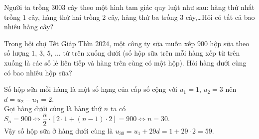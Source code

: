 \begin{bt}%
Người ta trồng $3003$ cây theo một hình tam giác quy luật như sau: hàng thứ nhất trồng $1$ cây, hàng thứ hai trồng $2$ cây, hàng thứ ba trồng $3$ cây,\ldots Hỏi có tất cả bao nhiêu hàng cây?
\end{bt}

\begin{bt}%
    Trong hội chợ Tết Giáp Thìn $2024$, một công ty sữa muốn xếp $900$ hộp sữa theo số lượng $1$, $3$, $5$, $\ldots$ từ trên xuống dưới (số hộp sữa trên mỗi hàng xếp từ trên xuống là các số lẻ liên tiếp và hàng trên cùng có một hộp). Hỏi hàng dưới cùng có bao nhiêu hộp sữa?
    \loigiai
    {Số hộp sữa mỗi hàng là một số hạng của cấp số cộng với $u_1=1$, $u_2=3$ nên $d=u_2-u_1=2$.\\
        Gọi hàng dưới cùng là hàng thứ $n$ ta có $S_n=900\Leftrightarrow \dfrac{n}{2}\cdot \left[2\cdot 1+(n-1)\cdot 2\right]=900\Leftrightarrow n=30$.\\
        Vậy số hộp sữa ở hàng dưới cùng là $u_{30}=u_1+29d=1+29\cdot 2=59$. 
        
    }
\end{bt}

